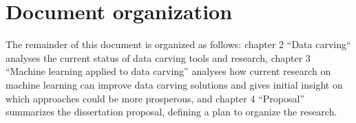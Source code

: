 \section{Document organization}
The remainder of this document is organized as follows:
    chapter 2 ``Data carving`` analyses the current status of data carving tools and research, 
    chapter 3 ``Machine learning applied to data carving'' analyses how current research on machine learning can improve data carving solutions and gives initial insight on which approaches could be more prosperous,
    and
    chapter 4 ``Proposal'' summarizes the dissertation proposal, defining a plan to organize the research.

